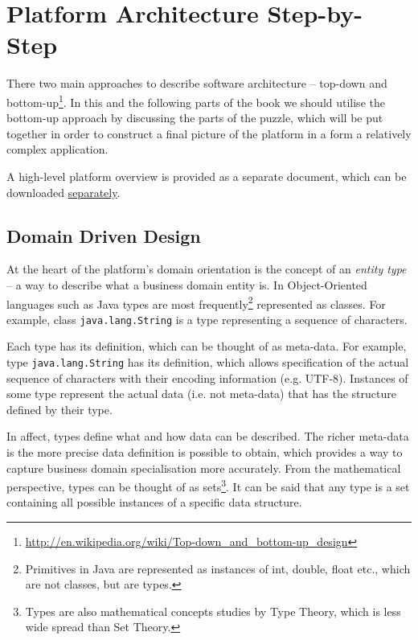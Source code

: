 \chapter{Platform Architecture Step-by-Step}\label{ch01:01}


  There two main approaches to describe software architecture -- top-down and bottom-up\footnote{\url{http://en.wikipedia.org/wiki/Top-down_and_bottom-up_design}}.
  In this and the following parts of the book we should utilise the bottom-up approach by discussing the parts of the puzzle, which will be put together in order to construct a final picture of the platform in a form a relatively complex application.

  A high-level platform overview is provided as a separate document, which can be downloaded \href{http://www.fielden.com.ua/trac/pnl-tg/attachment/wiki/WikiStart/architecture-overview.pdf}{separately}.

\section{Domain Driven Design}

  At the heart of the platform's domain orientation is the concept of an \emph{entity type} -- a way to describe what a business domain entity is.
  In Object-Oriented languages such as Java types are most frequently\footnote{Primitives in Java are represented as instances of int, double, float etc., which are not classes, but are types.} represented as classes.
  For example, class \texttt{java.lang.String} is a type representing a sequence of characters.
  
  Each type has its definition, which can be thought of as meta-data.
  For example, type \texttt{java.lang.String} has its definition, which allows specification of the actual sequence of characters with their encoding information (e.g. UTF-8).
  Instances of some type represent the actual data (i.e. not meta-data) that has the structure defined by their type.
  
  In affect, types define what and how data can be described.
  The richer meta-data is the more precise data definition is possible to obtain, which provides a way to capture business domain specialisation more accurately.
  From the mathematical perspective, types can be thought of as sets\footnote{Types are also mathematical concepts studies by Type Theory, which is less wide spread than Set Theory.}.
  It can be said that any type is a set containing all possible instances of a specific data structure.

